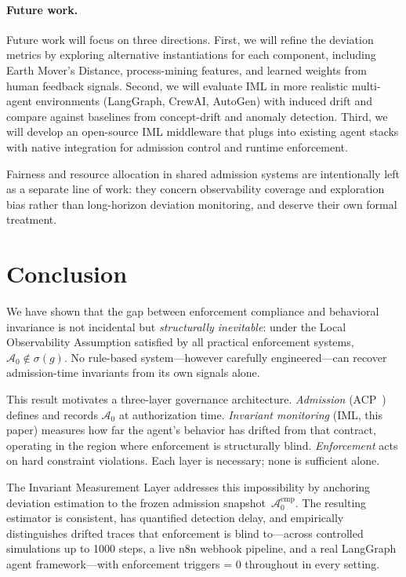 \documentclass[11pt]{article}
\newcommand{\Azero}{\mathcal{A}_0}
\newcommand{\sigg}{\sigma(g)}
\begin{document}
\paragraph{Future work.}
Future work will focus on three directions.  First, we will refine the
deviation metrics by exploring alternative instantiations for each component,
including Earth Mover's Distance, process-mining features, and learned weights
from human feedback signals.  Second, we will evaluate IML in more realistic
multi-agent environments (LangGraph, CrewAI, AutoGen) with induced drift and
compare against baselines from concept-drift and anomaly detection.  Third,
we will develop an open-source IML middleware that plugs into existing agent
stacks with native integration for admission control and runtime enforcement.

Fairness and resource allocation in shared admission systems are
intentionally left as a separate line of work: they concern observability
coverage and exploration bias rather than long-horizon deviation monitoring,
and deserve their own formal treatment.

\section{Conclusion}
\label{sec:conclusion}

We have shown that the gap between enforcement compliance and behavioral
invariance is not incidental but \emph{structurally inevitable}: under the
Local Observability Assumption satisfied by all practical enforcement systems,
$\Azero \notin \sigg$.  No rule-based system---however carefully
engineered---can recover admission-time invariants from its own signals alone.

This result motivates a three-layer governance architecture.
\emph{Admission} (ACP~\citep{fernandez2026acp}) defines and records
$\Azero$ at authorization time.
\emph{Invariant monitoring} (IML, this paper) measures how far the
agent's behavior has drifted from that contract, operating in the region
where enforcement is structurally blind.
\emph{Enforcement} acts on hard constraint violations.
Each layer is necessary; none is sufficient alone.

The Invariant Measurement Layer addresses this impossibility by anchoring
deviation estimation to the frozen admission snapshot~$\Azero^{\mathrm{emp}}$.
The resulting estimator is consistent, has quantified detection delay, and
empirically distinguishes drifted traces that enforcement is blind to---across
controlled simulations up to 1000 steps, a live n8n webhook pipeline, and a
real LangGraph agent framework---with enforcement triggers = 0 throughout in
every setting.
\end{document}
